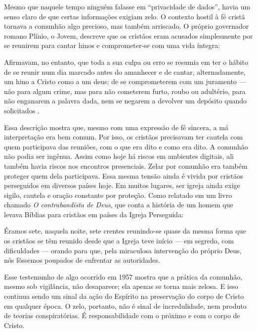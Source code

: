 Mesmo que naquele tempo ninguém falasse em “privacidade de dados”, havia um senso claro de que certas informações exigiam zelo. O contexto hostil à fé cristã tornava a comunhão algo precioso, mas também arriscado. O próprio governador romano Plínio, o Jovem, descreve que os cristãos eram acusados simplesmente por se reunirem para cantar hinos e comprometer-se com uma vida íntegra:

\begin{citacao}
    Afirmavam, no entanto, que toda a sua culpa ou erro se resumia em ter o hábito de se reunir num dia marcado antes do amanhecer e de cantar, alternadamente, um hino a Cristo como a um deus; de se comprometerem com um juramento — não para algum crime, mas para não cometerem furto, roubo ou adultério, para não enganarem a palavra dada, nem se negarem a devolver um depósito quando solicitados \cite[p.~272]{plinioCartasX}.
\end{citacao}

Essa descrição mostra que, mesmo com uma expressão de fé sincera, a má interpretação era bem comum. Por isso, os cristãos precisavam ter cautela com quem participava das reuniões, com o que era dito e como era dito. A comunhão não podia ser ingênua. Assim como hoje há riscos em ambientes digitais, ali também havia riscos nos encontros presenciais. Zelar por comunhão era também proteger quem dela participava. Essa mesma tensão ainda é vivida por cristãos perseguidos em diversos países hoje. Em muitos lugares, ser igreja ainda exige sigilo, cautela e oração constante por proteção. Como relatado em um livro chamado \textit{O contrabandista de Deus}, que conta a história de um homem que levava Bíblias para cristãos em países da Igreja Perseguida:

\begin{citacao}
    Éramos sete, naquela noite, sete crentes reunindo-se quase da mesma forma que os cristãos se têm reunido desde que a Igreja teve início — em segredo, com dificuldades — orando para que, pela miraculosa intervenção do próprio Deus, nós fôssemos poupados de enfrentar as autoridades. \cite[p.~166]{brotherAndrew}
\end{citacao}

Esse testemunho de algo ocorrido em 1957 mostra que a prática da comunhão, mesmo sob vigilância, não desaparece; ela apenas se torna mais zelosa. E isso continua sendo um sinal da ação do Espírito na preservação do corpo de Cristo em qualquer época. O zelo, portanto, não é sinal de incredulidade, nem produto de teorias conspiratórias. É responsabilidade com o próximo e com o corpo de Cristo.

